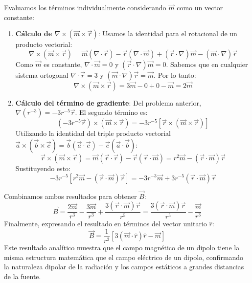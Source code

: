 \documentclass[a4paper]{article}
\begin{document}
Evaluamos los términos individualmente considerando $\vec{m}$ como un vector constante:
\begin{enumerate}
    \item \textbf{Cálculo de $\nabla \times (\vec{m} \times \vec{r})$}: Usamos la identidad para el rotacional de un producto vectorial:
    \begin{equation}
    \nabla \times (\vec{m} \times \vec{r}) = \vec{m}(\nabla \cdot \vec{r}) - \vec{r}(\nabla \cdot \vec{m}) + (\vec{r} \cdot \nabla)\vec{m} - (\vec{m} \cdot \nabla)\vec{r}
    \end{equation}
    Como $\vec{m}$ es constante, $\nabla \cdot \vec{m} = 0$ y $(\vec{r} \cdot \nabla)\vec{m} = 0$. Sabemos que en cualquier sistema ortogonal $\nabla \cdot \vec{r} = 3$ y $(\vec{m} \cdot \nabla)\vec{r} = \vec{m}$. Por lo tanto:
    \begin{equation}
    \nabla \times (\vec{m} \times \vec{r}) = 3\vec{m} - 0 + 0 - \vec{m} = 2\vec{m}
    \end{equation}

    \item \textbf{Cálculo del término de gradiente}: Del problema anterior, $\nabla(r^{-3}) = -3 r^{-5} \vec{r}$. El segundo término es:
    \begin{equation}
    (-3 r^{-5} \vec{r}) \times (\vec{m} \times \vec{r}) = -3 r^{-5} [ \vec{r} \times (\vec{m} \times \vec{r}) ]
    \end{equation}
    Utilizando la identidad del triple producto vectorial $\vec{a} \times (\vec{b} \times \vec{c}) = \vec{b}(\vec{a} \cdot \vec{c}) - \vec{c}(\vec{a} \cdot \vec{b})$:
    \begin{equation}
    \vec{r} \times (\vec{m} \times \vec{r}) = \vec{m}(\vec{r} \cdot \vec{r}) - \vec{r}(\vec{r} \cdot \vec{m}) = r^2 \vec{m} - (\vec{r} \cdot \vec{m})\vec{r}
    \end{equation}
    Sustituyendo esto:
    \begin{equation}
    -3 r^{-5} [ r^2 \vec{m} - (\vec{r} \cdot \vec{m})\vec{r} ] = -3 r^{-3} \vec{m} + 3 r^{-5} (\vec{r} \cdot \vec{m})\vec{r}
    \end{equation}
\end{enumerate}

Combinamos ambos resultados para obtener $\vec{B}$:
\begin{equation}
\vec{B} = \frac{2\vec{m}}{r^3} - \frac{3\vec{m}}{r^3} + \frac{3(\vec{r} \cdot \vec{m})\vec{r}}{r^5} = \frac{3(\vec{r} \cdot \vec{m})\vec{r}}{r^5} - \frac{\vec{m}}{r^3}
\end{equation}
Finalmente, expresando el resultado en términos del vector unitario $\hat{r}$:
\begin{equation}
\vec{B} = \frac{1}{r^3} \left[ 3(\vec{m} \cdot \hat{r})\hat{r} - \vec{m} \right]
\end{equation}
Este resultado analítico muestra que el campo magnético de un dipolo tiene la misma estructura matemática que el campo eléctrico de un dipolo, confirmando la naturaleza dipolar de la radiación y los campos estáticos a grandes distancias de la fuente.
\end{document}
